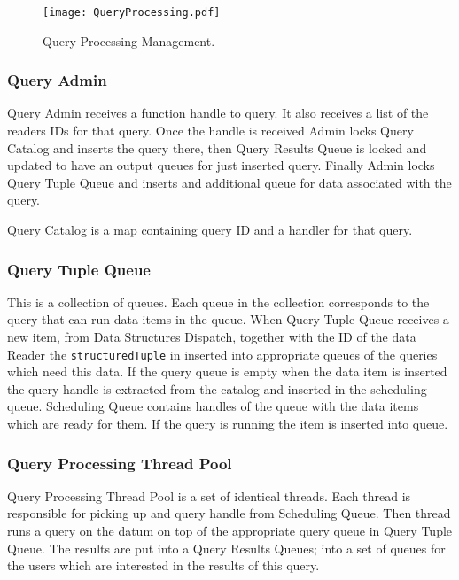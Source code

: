 \documentclass[11pt]{article}
\begin{document}
\begin{figure}
  \texttt{[image: QueryProcessing.pdf]}
  \caption{Query Processing Management.}
  \label{QueryProcessingPic}
\end{figure}

\subsubsection{Query Admin}

Query Admin receives a function handle to query. It also receives a list of the readers IDs for that query. Once the handle is received Admin locks Query Catalog and inserts the query there, then Query Results Queue is locked and updated to have an output queues for just inserted query. Finally Admin locks Query Tuple Queue and inserts and additional queue for data associated with the query. 

Query Catalog is a map containing query ID and a handler for that query. 

\subsubsection{Query Tuple Queue}

This is a collection of queues. Each queue in the collection corresponds to the query that can run data items in the queue. When Query Tuple Queue receives a new item, from Data Structures Dispatch, together with the ID of the data Reader the {\tt structuredTuple} in inserted into appropriate queues of the queries which need this data.  If the query queue is empty when the data item is inserted the query handle is extracted from the catalog and inserted in the scheduling queue. Scheduling Queue contains handles of the queue with the data items which are ready for them. If the query is running the item is inserted into queue.

\subsubsection{Query Processing Thread Pool}

Query Processing Thread Pool is a set of identical threads. Each thread is responsible for picking up and query handle from Scheduling Queue. Then thread runs a query on the datum on top of the appropriate query queue in Query Tuple Queue. The results are put into a Query Results Queues; into a set of queues for the users which are interested in the results of this query. 
\end{document}
